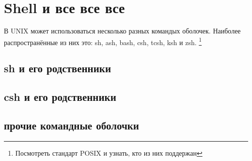 \chapter{Shell и все все все}
В UNIX может использоваться несколько разных командых оболочек.
Наиболее распространённые из них это: sh, ash, bash, csh, tcsh, ksh и zsh.
\footnote{Посмотреть стандарт POSIX и узнать, кто из них поддержан}
\section{sh и его родственники}
\section{csh и его родственники}
\section{прочие командные оболочки}